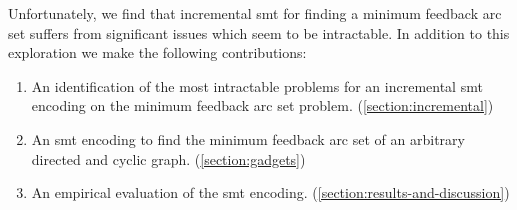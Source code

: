 Unfortunately, we find that incremental \ac{smt} for finding a minimum feedback
arc set suffers from significant issues which seem to be intractable. In
addition to this exploration we make the following contributions:
%
\begin{enumerate}
\item An identification of the most intractable problems for an incremental
  \ac{smt} encoding on the minimum feedback arc set problem.
  (\autoref{section:incremental})
\item An \ac{smt} encoding to find the minimum feedback arc set of an arbitrary
  directed and cyclic graph. (\autoref{section:gadgets})
\item An empirical evaluation of the \ac{smt} encoding.
  (\autoref{section:results-and-discussion})
\end{enumerate}



